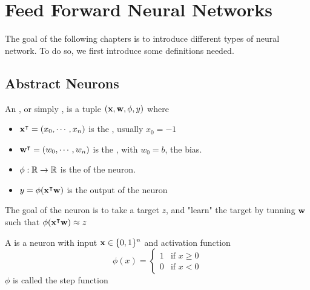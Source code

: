 \chapter{Feed Forward Neural Networks}

The goal of the following chapters is to introduce different types of neural network. To do so, we first introduce some definitions needed. 

\section{Abstract Neurons}\label{abstractneurons}

\begin{definition}
    An , or simply , is a tuple $(\vx,\vw,\phi,y)$ where
    \begin{itemize}
        \item $\vx^\intercal = (x_0,\cdots,x_n)$ is the , usually $x_0=-1$
        \item $\vw^\intercal = (w_0,\cdots,w_n)$ is the , with $w_0 = b$, the bias.
        \item $\phi:\R\to\R$ is the  of the neuron.
        \item $y=\phi(\vx^\intercal\vw)$ is the output of the neuron
    \end{itemize}
\end{definition}

The goal of the neuron is to take a target $z$, and "learn" the target by tunning $\vw$ such that $\phi(\vx^\intercal\vw) \approx z$ 

\begin{definition}
    A  is a neuron with input $\vx\in\{0,1\}^n$ and activation function
    \begin{equation*}
        \phi(x) = 
        \begin{cases}
            1 & \text{if } x \geq 0\\
            0 & \text{if } x < 0
        \end{cases}
    \end{equation*}
    $\phi$ is called the  step function
\end{definition}

